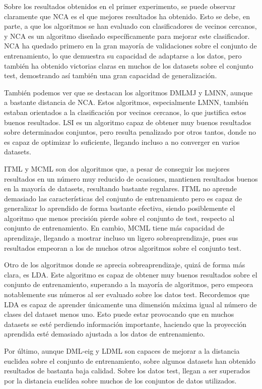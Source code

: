 Sobre los resultados obtenidos en el primer experimento, se puede observar claramente que NCA es el que mejores resultados ha obtenido. Esto se debe, en parte, a que los algoritmos se han evaluado con clasificadores de vecinos cercanos, y NCA es un algoritmo diseñado específicamente para mejorar este clasificador. NCA ha quedado primero en la gran mayoría de validaciones sobre el conjunto de entrenamiento, lo que demuestra su capacidad de adaptarse a los datos, pero también ha obtenido victorias claras en muchos de los datasets sobre el conjunto test, demostrando así también una gran capacidad de generalización.

También podemos ver que se destacan los algoritmos DMLMJ y LMNN, aunque a bastante distancia de NCA. Estos algoritmos, especialmente LMNN, también estaban orientados a la clasificación por vecinos cercanos, lo que justifica estos buenos resultados.  LSI es un algoritmo capaz de obtener muy buenos resultados sobre determinados conjuntos, pero resulta penalizado por otros tantos, donde no es capaz de optimizar lo suficiente, llegando incluso a no converger en varios datasets.

ITML y MCML son dos algoritmos que, a pesar de conseguir los mejores resultados en un número muy reducido de ocasiones, mantienen resultados buenos en la mayoría de datasets, resultando bastante regulares. ITML no aprende demasiado las características del conjunto de entrenamiento pero es capaz de generalizar lo aprendido de forma bastante efectiva, siendo posiblemente el algoritmo que menos precisión pierde sobre el conjunto de test, respecto al conjunto de entrenamiento. En cambio, MCML tiene más capacidad de aprendizaje, llegando a mostrar incluso un ligero sobreaprendizaje, pues sus resultados empeoran a los de muchos otros algoritmos sobre el conjunto test.

Otro de los algoritmos donde se aprecia sobreaprendizaje, quizá de forma más clara, es LDA. Este algoritmo es capaz de obtener muy buenos resultados sobre el conjunto de entrenamiento, superando a la mayoría de algoritmos, pero empeora notablemente sus números al ser evaluado sobre los datos test. Recordemos que LDA es capaz de aprender únicamente una dimensión máxima igual al número de clases del dataset menos uno. Esto puede estar provocando que en muchos datasets se esté perdiendo información importante, haciendo que la proyección aprendida esté demasiado ajustada a los datos de entrenamiento.

Por último, aunque DML-eig y LDML son capaces de mejorar a la distancia euclidea sobre el conjunto de entrenamiento, sobre algunos datasets han obtenido resultados de bastanta baja calidad. Sobre los datos test, llegan a ser superados por la distancia euclídea sobre muchos de los conjuntos de datos utilizados.

